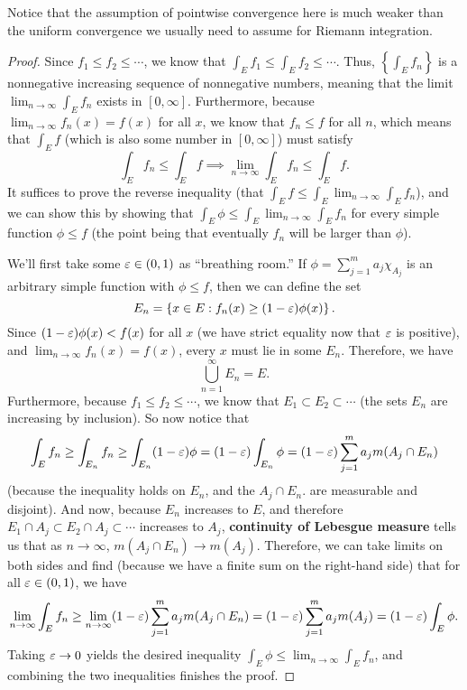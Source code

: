 Notice that the assumption of pointwise convergence here is much weaker than the uniform convergence we usually need to assume for Riemann integration.

\begin{proof}
Since $f_1 \le f_2 \le \cdots$, we know that $\int_E f_1 \le \int_E f_2 \le \cdots$. Thus, $\left\{\int_E f_n\right\}$ is a nonnegative increasing sequence of nonnegative numbers, meaning that the limit $\lim_{n \to \infty} \int_E f_n$ exists in $[0, \infty]$. Furthermore, because $\lim_{n \to \infty} f_n(x) = f(x)$ for all $x$, we know that $f_n \le f$ for all $n$, which means that $\int_E f$ (which is also some number in $[0, \infty]$) must satisfy 
\[
    \int_E f_n \le \int_E f \implies \lim_{n \to \infty}\int_E f_n \le \int_E f.
\]
It suffices to prove the reverse inequality (that $\int_E f \le \int_E \lim_{n \to \infty}\int_E f_n$), and we can show this by showing that $\int_E \phi \le \int_E \lim_{n \to \infty}\int_E f_n$ for every simple function $\phi \le f$ (the point being that eventually $f_n$ will be larger than $\phi$). 

We'll first take some $\varepsilon \in (0, 1)$ as ``breathing room.'' If $\phi = \sum_{j=1}^m a_j \chi_{A_j}$ is an arbitrary simple function with $\phi \le f$, then we can define the set
\[
    E_n = \left\{x \in E: f_n(x) \ge (1- \varepsilon) \phi(x)\right\}.
\]
Since $(1 - \varepsilon) \phi(x) < f(x)$ for all $x$ (we have strict equality now that $\varepsilon$ is positive), and $\lim_{n \to \infty} f_n(x) = f(x)$, every $x$ must lie in some $E_n$. Therefore, we have
\[
    \bigcup_{n=1}^{\infty} E_n = E.
\]
Furthermore, because $f_1 \le f_2 \le \cdots$, we know that $E_1 \subset E_2 \subset \cdots$ (the sets $E_n$ are increasing by inclusion). So now notice that
\[
    \int_E f_n \ge \int_{E_n} f_n \ge \int_{E_n} (1 - \varepsilon) \phi = (1-\varepsilon) \int_{E_n} \phi = (1 - \varepsilon) \sum_{j=1}^m a_j m(A_j \cap E_n)
\]
(because the inequality holds on $E_n$, and the $A_j \cap E_n$. are measurable and disjoint). And now, because $E_n$ increases to $E$, and therefore $E_1 \cap A_j \subset E_2 \cap A_j \subset \cdots$ increases to $A_j$, \textbf{continuity of Lebesgue measure} tells us that as $n \to \infty$, $m(A_j \cap E_n) \to m(A_j)$. Therefore, we can take limits on both sides and find (because we have a finite sum on the right-hand side) that for all $\varepsilon \in (0, 1)$, we have
\[
    \lim_{n \to \infty} \int_E f_n \ge \lim_{n \to \infty} (1 - \varepsilon) \sum_{j=1}^m a_j m(A_j \cap E_n) = (1 - \varepsilon) \sum_{j=1}^m a_j m(A_j) = (1 - \varepsilon) \int_E \phi.
\]
Taking $\varepsilon \to 0$ yields the desired inequality $\int_E \phi \le \lim_{n \to \infty} \int_E f_n$, and combining the two inequalities finishes the proof.
\end{proof}

